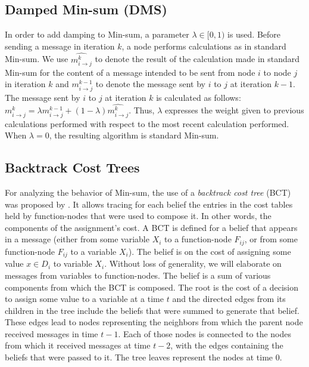 \documentclass[letterpaper]{article} %
\theoremstyle{definition}
\theoremstyle{remark}
\begin{document}
\subsection{Damped Min-sum (DMS)}
In order to add damping to Min-sum, a parameter $\lambda \in [0,1)$ is used. Before sending a message in iteration $k$, a node performs calculations as in standard Min-sum. We use $\widehat{m^k_{i \rightarrow j}}$ to denote the result of the calculation made in standard Min-sum for the content of a message intended to be sent from node $i$ to node $j$ in iteration $k$ and $m^{k-1}_{i \rightarrow j}$ to denote the message sent by $i$ to $j$ at iteration $k-1$. The message sent by $i$ to $j$ at iteration $k$ is calculated as follows:
$m^{k}_{i \rightarrow j} = \lambda m^{k-1}_{i \rightarrow j} + (1 - \lambda) \widehat{m^k_{i \rightarrow j}}$.
Thus, $\lambda$ expresses the weight given to previous calculations performed with respect to the most recent calculation performed. When $\lambda = 0$, the resulting algorithm is standard Min-sum.
\subsection{Backtrack Cost Trees}
\label{sec:bct}
	For analyzing the behavior of Min-sum, the use of a {\em backtrack cost tree} (BCT) was proposed by \citet{ZivanLG20}. It allows tracing for each belief the entries in the cost tables held by function-nodes that were used to compose it. In other words, the components of the assignment's cost.
A BCT is defined for a belief that appears in a message (either from some variable $X_{i}$ to a function-node $F_{ij}$, or from some function-node $F_{ij}$ to a variable $X_{i}$). The belief is on the cost of assigning some value $x\in D_{i}$ to variable $X_{i}$. Without loss of generality, we will elaborate on messages from variables to function-nodes.
The belief is a sum of various components from which the BCT is composed. The root is the cost of a decision to assign some value to a variable at a time $t$ and the directed edges from its children in the tree include the beliefs that were summed to generate that belief. These edges lead to nodes representing the neighbors from which the parent node received messages in time $t-1$. Each of those nodes is connected to the nodes from which it received messages at time $t-2$, with the edges containing the beliefs that were passed to it. The tree leaves represent the nodes at time $0$.

\end{document}
